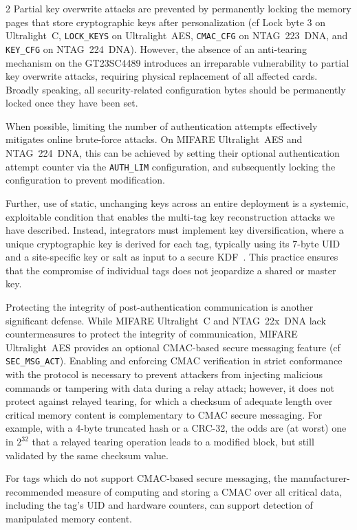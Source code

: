 \documentclass[10pt,letterpaper]{article}
\begin{document}
\begin{multicols}{2}
Partial key overwrite attacks are prevented by permanently locking the memory pages that store cryptographic keys after personalization (cf Lock byte 3 on Ultralight~C, \texttt{LOCK\_KEYS} on Ultralight~AES, \texttt{CMAC\_CFG} on NTAG~223~DNA, and \texttt{KEY\_CFG} on NTAG~224~DNA). However, the absence of an anti-tearing mechanism on the GT23SC4489 introduces an irreparable vulnerability to partial key overwrite attacks, requiring physical replacement of all affected cards. Broadly speaking, all security-related configuration bytes should be permanently locked once they have been set.

When possible, limiting the number of authentication attempts effectively mitigates online brute-force attacks.
On MIFARE Ultralight~AES and NTAG~224~DNA, this can be achieved by setting their optional authentication attempt counter via the \texttt{AUTH\_LIM} configuration, and subsequently locking the configuration to prevent modification.

Further, use of static, unchanging keys across an entire deployment is a systemic, exploitable condition that enables the multi-tag key reconstruction attacks we have described. Instead, integrators must implement key diversification, where a unique cryptographic key is derived for each tag, typically using its 7-byte UID and a site-specific key or salt as input to a secure KDF~\cite{nxp_an10922}. This practice ensures that the compromise of individual tags does not jeopardize a shared or master key.

Protecting the integrity of post-authentication communication is another significant defense. While MIFARE Ultralight~C and NTAG~22x~DNA lack countermeasures to protect the integrity of communication, MIFARE Ultralight~AES provides an optional CMAC-based secure messaging feature (cf \texttt{SEC\_MSG\_ACT}). Enabling and enforcing CMAC verification in strict conformance with the protocol is necessary to prevent attackers from injecting malicious commands or tampering with data during a relay attack; however, it does not protect against relayed tearing, for which a checksum of adequate length over critical memory content is complementary to CMAC secure messaging. For example, with a 4-byte truncated hash or a CRC-32, the odds are (at worst) one in $2^{32}$ that a relayed tearing operation leads to a modified block, but still validated by the same checksum value.

For tags which do not support CMAC-based secure messaging, the manufacturer-recommended measure of computing and storing a CMAC over all critical data, including the tag's UID and hardware counters, can support detection of manipulated memory content.


\end{multicols}
\end{document}
